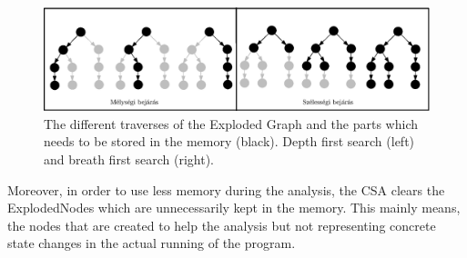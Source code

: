 \begin{figure}[h]
	\centering
	\includegraphics[width=1\textwidth]{img/memoria.eps}
	\caption{The different traverses of the Exploded Graph and the parts which 
	needs to be stored in the memory (black). Depth first search (left) and 
	breath first search (right).}
	\label{fig:bejaras_szemleltetes}
\end{figure}

Moreover, in order to use less memory during the analysis, the CSA clears the ExplodedNodes which are unnecessarily kept in the memory. This mainly means, the nodes that are created to help the analysis but not representing concrete state changes in the actual running of the program.


